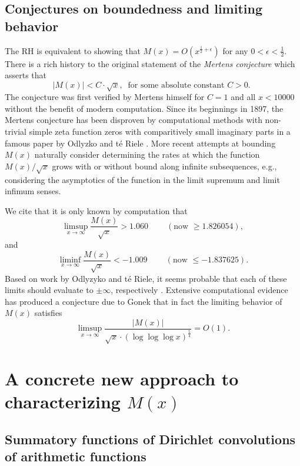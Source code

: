 \documentclass[11pt,reqno,a4letter]{article}
\numberwithin{figure}{section}
\numberwithin{table}{section}
\newcommand{\cf}{\textit{cf.\ }}
\newcommand{\seqnum}[1]{\href{http://oeis.org/#1}{\color{ProcessBlue}{\underline{#1}}}}
\theoremstyle{plain}
\numberwithin{theorem}{section}
\theoremstyle{definition}
\begin{document}
\subsection{Conjectures on boundedness and limiting behavior} 

The RH is equivalent to showing that 
$M(x) = O\left(x^{\frac{1}{2}+\epsilon}\right)$ for any 
$0 < \epsilon < \frac{1}{2}$. 
There is a rich history to the original statement of the \emph{Mertens conjecture} which 
asserts that 
\[ 
|M(x)| < C \cdot \sqrt{x},\ \text{ for some absolute constant $C > 0$. }
\] 
The conjecture was first verified by Mertens himself for $C = 1$ and all $x < 10000$ 
without the benefit of modern computation. 
Since its beginnings in 1897, the Mertens conjecture has been disproven by computational methods with
non-trivial simple zeta function zeros with comparitively small imaginary parts in a famous paper by 
Odlyzko and t\'{e} Riele \cite{ODLYZ-TRIELE}. 
More recent attempts 
at bounding $M(x)$ naturally consider determining the rates at which the function 
$M(x) / \sqrt{x}$ grows with or without bound along infinite 
subsequences, e.g., considering the asymptotics of the function in the limit supremum and 
limit infimum senses. 

We cite that it is only known by computation 
that \cite[\cf \S 4.1]{PRIMEREC} 
\cite[\cf \seqnum{A051400}; \seqnum{A051401}]{OEIS} 
\[
\limsup_{x\rightarrow\infty} \frac{M(x)}{\sqrt{x}} > 1.060\ \qquad (\text{now } \geq 1.826054), 
\] 
and 
\[ 
\liminf_{x\rightarrow\infty} \frac{M(x)}{\sqrt{x}} < -1.009\ \qquad (\text{now } \leq -1.837625). 
\] 
Based on work by Odlyzyko and t\'{e} Riele, it seems probable that 
each of these limits should evaluate to $\pm \infty$, respectively 
\cite{ODLYZ-TRIELE,MREVISITED,ORDER-MERTENSFN,HURST-2017}. 
Extensive computational evidence has produced 
a conjecture due to Gonek that in fact the limiting behavior of 
$M(x)$ satisfies \cite{NG-MERTENS}
$$\limsup_{x \rightarrow \infty} \frac{|M(x)|}{\sqrt{x} \cdot (\log\log\log x)^{\frac{5}{4}}} = O(1).$$ 

\newpage 
\section{A concrete new approach to characterizing $M(x)$} 

\subsection{Summatory functions of Dirichlet convolutions of arithmetic functions} 
\end{document}

